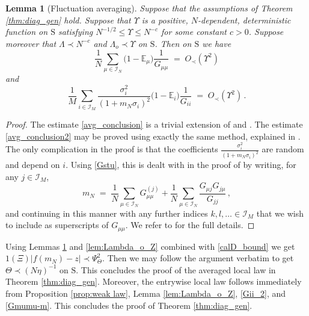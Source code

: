 \documentclass[11pt]{article} %
\numberwithin{equation}{section}
\numberwithin{figure}{section}
\theoremstyle{plain} %
\newtheorem{lemma}[theorem]{Lemma}
\theoremstyle{definition} %
\newcommand{\f}[1]{\boldsymbol{\mathrm{#1}}} %
\renewcommand{\cal}{\mathcal}
\newcommand{\E}{\mathbb{E}}
\renewcommand{\leq}{\leqslant}
\newcommand{\ind}[1]{\f 1 (#1)}
\newcommand{\pb}[1]{\bigl({#1}\bigr)}
\newcommand{\abs}[1]{\lvert #1 \rvert}
\begin{document}
\begin{lemma}[Fluctuation averaging] \label{lem:fluct_avg}
Suppose that the assumptions of Theorem \ref{thm:diag_gen} hold.
Suppose that $\Upsilon$ is a positive, $N$-dependent, deterministic function on $\f S$ satisfying $N^{-1/2} \leq \Upsilon \leq N^{-c}$ for some constant $c > 0$. Suppose moreover that $\Lambda \prec N^{-c}$ and $\Lambda_o \prec \Upsilon$ on $\f S$. Then on $\f S$ we have
\begin{equation} \label{avg_conclusion}
\frac{1}{N} \sum_{\mu \in \cal I_N} \pb{1 - \E_\mu} \frac{1}{G_{\mu \mu}} \;=\; O_\prec(\Upsilon^2)
\end{equation}
and
\begin{equation} \label{avg_conclusion2}
\frac{1}{M} \sum_{i \in \cal I_M} \frac{\sigma_i^2}{(1 + m_N \sigma_i)^2} \pb{1 - \E_i} \frac{1}{G_{ii}} \;=\; O_\prec(\Upsilon^2) \,.
\end{equation}
\end{lemma}

\begin{proof}
The estimate \eqref{avg_conclusion} is a trivial extension of \cite[Lemma 4.9]{BEKYY} and \cite[Theorem 4.7]{EKYY4}. The estimate \eqref{avg_conclusion2} may be proved using exactly the same method, explained in \cite[Appendix B]{EKYY4}. The only complication in the proof is that the coefficients $\frac{\sigma_i^2}{(1 + m_N \sigma_i)^2}$ are random and depend on $i$. Using \eqref{Gstu}, this is dealt with in the proof of \cite[Appendix B]{EKYY4} by writing, for any $j \in \cal I_M$,
\begin{equation*}
m_N \;=\; \frac{1}{N} \sum_{\mu \in \cal I_N} G^{(j)}_{\mu \mu} + \frac{1}{N} \sum_{\mu \in \cal I_N} \frac{G_{\mu j} G_{j \mu}}{G_{jj}}\,,
\end{equation*}
and continuing in this manner with any further indices $k,l,\dots \in \cal I_M$ that we wish to include as superscripts of $G_{\mu \mu}$. We refer to \cite[Appendix B]{EKYY4} for the full details.
\end{proof}

Using Lemmas \ref{lem:fluct_avg} and \eqref{lem:Lambda_o_Z} combined with \eqref{calD_bound} we get $\ind{\Xi} \abs{f(m_N) - z} \prec \Psi_\Theta^2$. Then we may follow the argument \cite[Section 4.2]{BEKYY} verbatim to get $\Theta \prec (N \eta)^{-1}$ on $\f S$. This concludes the proof of the averaged local law in Theorem \ref{thm:diag_gen}. Moreover, the entrywise local law follows immediately from Proposition \ref{prop:weak law}, Lemma \ref{lem:Lambda_o_Z}, \eqref{Gii_2}, and \eqref{Gmumu-m}. This concludes the proof of Theorem \ref{thm:diag_gen}. 
\end{document}
